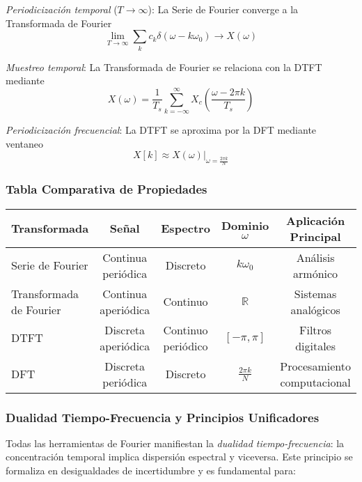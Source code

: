 \documentclass[
  11pt,
  letterpaper,
   addpoints,
   answers
  ]{exam}
\begin{document}
\textit{Periodicización temporal} (\(T \to \infty\)): La Serie de Fourier converge a la Transformada de Fourier
\begin{equation}
\lim_{T \to \infty} \sum_{k} c_k \delta(\omega - k\omega_0) \to X(\omega)
\end{equation}

\textit{Muestreo temporal}: La Transformada de Fourier se relaciona con la DTFT mediante
\begin{equation}
X(\omega) = \frac{1}{T_s}\sum_{k=-\infty}^{\infty} X_c\left(\frac{\omega - 2\pi k}{T_s}\right)
\end{equation}

\textit{Periodicización frecuencial}: La DTFT se aproxima por la DFT mediante ventaneo
\begin{equation}
X[k] \approx X(\omega)\big|_{\omega = \frac{2\pi k}{N}}
\end{equation}

\subsubsection*{Tabla Comparativa de Propiedades}

\begin{center}
\begin{tabular}{|l|c|c|c|c|}
\hline
\textbf{Transformada} & \textbf{Señal} & \textbf{Espectro} & \textbf{Dominio \(\omega\)} & \textbf{Aplicación Principal} \\
\hline
Serie de Fourier & Continua periódica & Discreto & \(k\omega_0\) & Análisis armónico \\
Transformada de Fourier & Continua aperiódica & Continuo & \(\mathbb{R}\) & Sistemas analógicos \\
DTFT & Discreta aperiódica & Continuo periódico & \([-\pi, \pi]\) & Filtros digitales \\
DFT & Discreta periódica & Discreto & \(\frac{2\pi k}{N}\) & Procesamiento computacional \\
\hline
\end{tabular}
\end{center}

\subsubsection*{Dualidad Tiempo-Frecuencia y Principios Unificadores}
Todas las herramientas de Fourier manifiestan la \textit{dualidad tiempo-frecuencia}: la concentración temporal implica dispersión espectral y viceversa. Este principio se formaliza en desigualdades de incertidumbre y es fundamental para:
\end{document}
